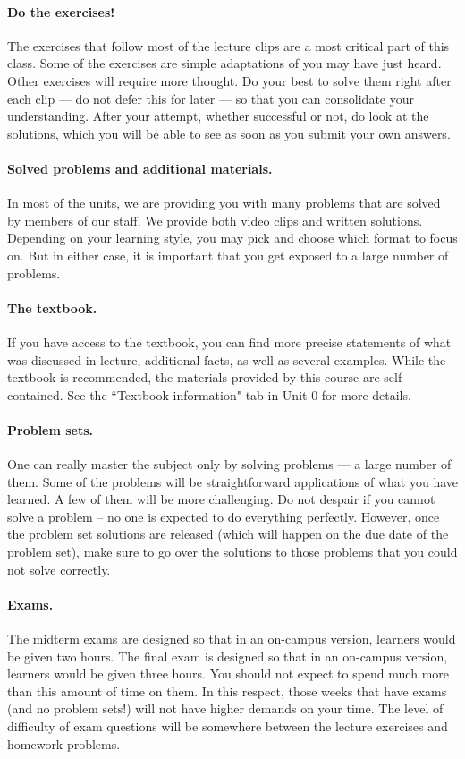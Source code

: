 \documentclass[pdftex, brazil, 12pt, twoside]{article}
\begin{document}
\paragraph{Do the exercises!} The exercises that follow most of the lecture clips are
a most critical part of this class. Some of the exercises are simple adaptations of
you may have just heard. Other exercises will require more thought. Do your best to
solve them right after each clip --- do not defer this for later --- so that you can
consolidate your understanding. After your attempt, whether successful or not, do
look at the solutions, which you will be able to see as soon as you submit your own
answers.

\paragraph{Solved problems and additional materials.} In most of the units, we are
providing you with many problems that are solved by members of our staff. We provide
both video clips and written solutions. Depending on your learning style, you may
pick and choose which format to focus on. But in either case, it is important that
you get exposed to a large number of problems.

\paragraph{The textbook.} If you have access to the textbook, you can find more precise
statements of what was discussed in lecture, additional facts, as well as several
examples. While the textbook is recommended, the materials provided by this course
are self-contained. See the “Textbook information" tab in Unit 0 for more details.

\paragraph{Problem sets.} One can really master the subject only by solving problems ---
a large number of them. Some of the problems will be straightforward applications
of what you have learned. A few of them will be more challenging. Do not despair
if you cannot solve a problem – no one is expected to do everything perfectly.
However, once the problem set solutions are released (which will happen on the due
date of the problem set), make sure to go over the solutions to those problems
that you could not solve correctly.

\paragraph{Exams.} The midterm exams are designed so that in an on-campus version,
learners would be given two hours. The final exam is designed so that in an on-campus
version, learners would be given three hours. You should not expect to spend much more
than this amount of time on them. In this respect, those weeks that have exams
(and no problem sets!) will not have higher demands on your time. The level of
difficulty of exam questions will be somewhere between the lecture exercises and
homework problems.
\end{document}
